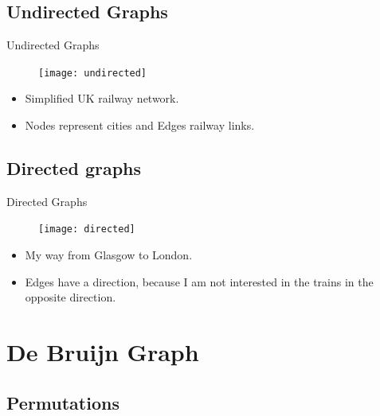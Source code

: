 \documentclass[hyperref={colorlinks=true}]{beamer}
\begin{document}
\subsection{Undirected Graphs}
\begin{frame}{Undirected Graphs}
  \begin{figure}
    \centering
    \texttt{[image: undirected]}
  \end{figure}
  \begin{itemize}
    \item[] Simplified UK railway network.
    \item[] \alert{Nodes} represent cities and \alert{Edges} railway links.
  \end{itemize}
\end{frame}

\subsection{Directed graphs}
\begin{frame}{Directed Graphs}
  \begin{figure}
    \centering
    \texttt{[image: directed]}
  \end{figure}
  \begin{itemize}
    \item[] My way from Glasgow to London.
    \item[] \alert{Edges} have a direction, because I am not interested in the
trains in the opposite direction.
  \end{itemize}
\end{frame}

\section{De Bruijn Graph}

\subsection{Permutations}
\end{document}
